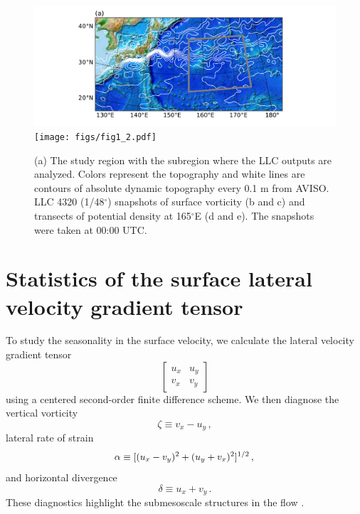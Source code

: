 \documentclass[grl]{agutex2015}
\begin{document}
\begin{article}
\begin{figure}[ht]
\begin{center}
\hspace{-1.25cm}\includegraphics[width=.75\textwidth]{figs/fig1_1.pdf}\\
\vspace{-.125cm}
\texttt{[image: figs/fig1\_2.pdf]}
 \caption{(a) The study region with the subregion where the LLC outputs are
          analyzed. Colors represent the topography and white lines are contours of absolute
          dynamic topography every 0.1 m from AVISO. LLC 4320 (1/48$^\circ$) snapshots of surface vorticity (b and c) and transects
          of potential density at 165$^\circ$E (d and e). The snapshots were
          taken at 00:00 UTC.}
\vspace{-1.5cm}
 \label{fig1}
 \end{center}
 \end{figure}

\section{Statistics of the surface lateral velocity gradient tensor}
To study the seasonality in the surface velocity, we calculate the lateral velocity gradient tensor
\begin{equation}
\left[\begin{matrix} u_x & u_y\\ v_x&v_y \end{matrix}\right]
\end{equation}
using a centered
second-order finite difference scheme. We then diagnose
the vertical vorticity
\begin{equation}
\zeta \equiv v_x - u_y\, ,
\end{equation}
lateral rate of strain
\begin{equation}
  \alpha \equiv [(u_x-v_y)^2 + (u_y + v_x)^2]^{1/2}\,,\\
\end{equation}
and horizontal divergence
\begin{equation}
\delta \equiv u_x + v_y\, .
\end{equation}
These diagnostics highlight the submesoscale structures in the flow
\citep[e.g.,][]{capet_etal2008a,shcherbina_etal2013}.


\end{article}
\end{document}
